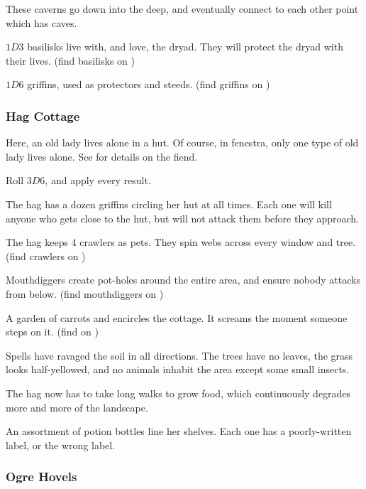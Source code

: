 \begin{multicols}{2}
\begin{dlist}
  These caverns go down into the \gls{deep}, and eventually connect to each other point which has caves.
  \item
  $1D3$ \glspl{basilisk} live with, and love, the dryad.
  They will protect the dryad with their lives.
  (find \glspl{basilisk} on )
  \item
  $1D6$ griffins, used as protectors and steeds.
  (find griffins on )
\end{dlist}

\subsubsection{Hag Cottage}
\label{hagPoint}

Here, an old lady lives alone in a hut.
Of course, in \gls{fenestra}, only one type of old lady lives alone.
See  for details on the fiend.

Roll $3D6$, and apply every result.

\begin{dlist}
  \item
  The \gls{hag} has a dozen griffins circling her hut at all times.
  Each one will kill anyone who gets close to the hut, but will not attack them before they approach.
  \item
  The \gls{hag} keeps 4 \glspl{crawler} as pets.
  They spin webs across every window and tree.
  (find \glspl{crawler} on )
  \item
  Mouthdiggers create pot-holes around the entire area, and ensure nobody attacks from below.
  (find mouthdiggers on )
  \item
  A garden of carrots and  encircles the cottage.
  It screams the moment someone steps on it.
  (find  on )
  \item
  Spells have ravaged the soil in all directions.
  The trees have no leaves, the grass looks half-yellowed, and no animals inhabit the area except some small insects.

  The \gls{hag} now has to take long walks to grow food, which continuously degrades more and more of the landscape.
  \item
  An assortment of potion bottles line her shelves.
  Each one has a poorly-written label, or the wrong label.
\end{dlist}

\subsubsection{Ogre Hovels}
\label{ogrePoint}


\end{multicols}
